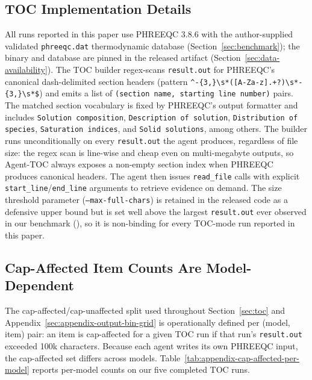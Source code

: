 \documentclass{article}
\begin{document}
\subsection{TOC Implementation Details}
\label{sec:appendix-toc-impl}

All runs reported in this paper use PHREEQC 3.8.6 with the author-supplied validated \texttt{phreeqc.dat} thermodynamic database (Section~\ref{sec:benchmark}); the binary and database are pinned in the released artifact (Section~\ref{sec:data-availability}). The TOC builder regex-scans \texttt{result.out} for PHREEQC's canonical dash-delimited section headers (pattern \texttt{\^{}-\{3,\}\textbackslash{}s*([A-Za-z].+?)\textbackslash{}s*-\{3,\}\textbackslash{}s*\$}) and emits a list of \texttt{(section name, starting line number)} pairs. The matched section vocabulary is fixed by PHREEQC's output formatter and includes \texttt{Solution composition}, \texttt{Description of solution}, \texttt{Distribution of species}, \texttt{Saturation indices}, and \texttt{Solid solutions}, among others. The builder runs unconditionally on every \texttt{result.out} the agent produces, regardless of file size: the regex scan is line-wise and cheap even on multi-megabyte outputs, so Agent-TOC always exposes a non-empty section index when PHREEQC produces canonical headers. The agent then issues \texttt{read\_file} calls with explicit \texttt{start\_line}/\texttt{end\_line} arguments to retrieve evidence on demand. The size threshold parameter (\texttt{--max-full-chars}) is retained in the released code as a defensive upper bound but is set well above the largest \texttt{result.out} ever observed in our benchmark (\OutputMaxChars), so it is non-binding for every TOC-mode run reported in this paper.

\subsection{Cap-Affected Item Counts Are Model-Dependent}
\label{sec:appendix-cap-affected-per-model}

The cap-affected/cap-unaffected split used throughout Section~\ref{sec:toc} and Appendix~\ref{sec:appendix-output-bin-grid} is operationally defined per (model, item) pair: an item is cap-affected for a given TOC run if that run's \texttt{result.out} exceeded 100k characters. Because each agent writes its own PHREEQC input, the cap-affected set differs across models. Table~\ref{tab:appendix-cap-affected-per-model} reports per-model counts on our five completed TOC runs.
\end{document}
